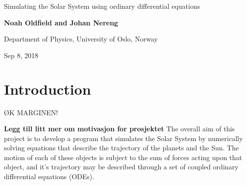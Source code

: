 \documentclass[%
oneside,                 %
final,                   %
10pt]{article}
\begin{document}

\newcommand{\exercisesection}[1]{\subsection*{#1}}






\thispagestyle{empty}

\begin{center}
{\LARGE\bf
\begin{spacing}{1.25}
Simulating the Solar System using ordinary differential equations
\end{spacing}
}
\end{center}


\begin{center}
{\bf Noah Oldfield and Johan Nereng}
\end{center}

    \begin{center}
\centerline{{\small Department of Physics, University of Oslo, Norway}}
\end{center}
    

\begin{center}
Sep 8, 2018
\end{center}

\vspace{1cm}

\section{Introduction}
ØK MARGINEN!


\textbf{Legg till litt mer om motivasjon for prosjektet} \newline
The overall aim of this project is to develop a program that simulates the Solar System by numerically solving equations that describe the trajectory of the planets and the Sun. The motion of each of these objects is subject to the sum of forces acting upon that object, and it's trajectory may be described through a set of coupled ordinary differential equations (ODEs). \newline
\end{document}
